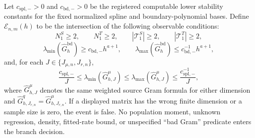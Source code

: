 Let \(c_{\mathrm{spl},-}>0\) and \(c_{\mathrm{bd},-}>0\) be the registered computable lower stability constants for the fixed normalized spline and boundary-polynomial bases.  Define \(\mathcal E_{n,m}(h)\) to be the intersection of the following observable conditions:
\[
 N^S_1\ge2,
 \qquad N^T_1\ge2,
 \qquad |\mathcal T^S_1|\ge2,
 \qquad |\mathcal T^T_1|\ge2,
\]
\[
 \lambda_{\min}(\widehat G^{\mathrm{bd}}_h)
 \ge c_{\mathrm{bd},-}h^{a+1},
 \qquad
 \lambda_{\max}(\widehat G^{\mathrm{bd}}_h)
 \le c_{\mathrm{bd},-}^{-1}h^{a+1},
\]
and, for each \(J\in\{J_{\mu,n},J_{r,n}\}\),
\[
 \frac{c_{\mathrm{spl},-}}{J}
 \le\lambda_{\min}(\widehat G^{\mu}_{h,J})
 \le\lambda_{\max}(\widehat G^{\mu}_{h,J})
 \le\frac{c_{\mathrm{spl},-}^{-1}}{J},
\]
where \(\widehat G^{\mu}_{h,J}\) denotes the same weighted source Gram formula for either dimension and \(\widehat G^{q}_{h,J_{r,n}}=\widehat G^{\mu}_{h,J_{r,n}}\).  If a displayed matrix has the wrong finite dimension or a sample size is zero, the event is false.  No population moment, unknown regression, density, fitted-rate bound, or unspecified ``bad Gram'' predicate enters the branch decision.